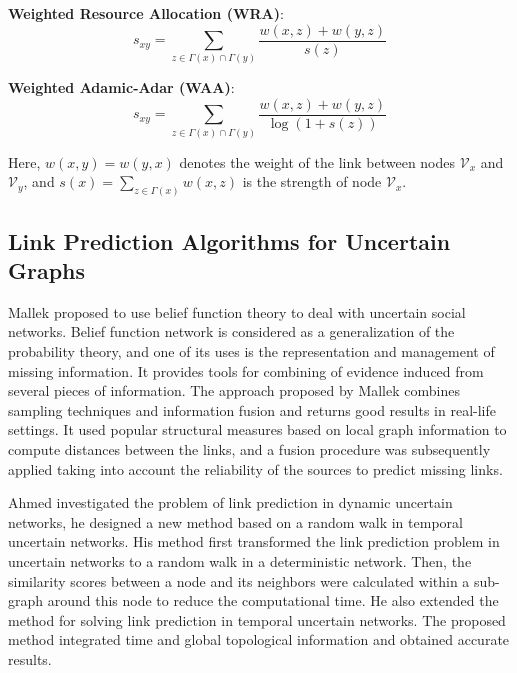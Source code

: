 \documentclass[\main/thesis.tex]{subfiles}
\begin{document}
\textbf{Weighted Resource Allocation (WRA)}:
\begin{equation}
s_{xy}=\sum_{z\in \Gamma(x)\cap\Gamma(y)}\frac{w(x,z)+w(y,z)}{s(z)}
\end{equation}

\textbf{Weighted Adamic-Adar (WAA)}:
\begin{equation}
s_{xy}=\sum_{z\in \Gamma(x)\cap\Gamma(y)}\frac{w(x,z)+w(y,z)}{\log(1+s(z))}
\end{equation}

Here, $w(x, y) = w(y, x)$ denotes the weight of the link between nodes $\mathcal{V}_x$ and $\mathcal{V}_y$, and $s(x)=\sum_{z\in\Gamma(x)}w(x,z)$ is the strength of node $\mathcal{V}_x$.

\subsection{Link Prediction Algorithms for Uncertain Graphs}
Mallek \cite{mallek2016evidential} proposed to use belief function theory to deal with uncertain social networks. Belief function network is considered as a generalization of the probability theory, and one of its uses is the representation and management of missing information. It provides tools for combining of evidence induced from several pieces of information. The approach proposed by Mallek combines sampling techniques and information fusion and returns good results in real-life settings. It used popular structural measures based on local graph information to compute distances between the links, and a fusion procedure was subsequently applied taking into account the reliability of the sources to predict missing links.

Ahmed \cite{ahmed2016efficient} investigated the problem of link prediction in dynamic uncertain networks, he designed a new method based on a random walk in temporal uncertain networks. His method first transformed the link prediction problem in uncertain networks to a random walk in a deterministic network. Then, the similarity scores between a node and its neighbors were calculated within a sub-graph around this node to reduce the computational time. He also extended the method for solving link prediction in temporal uncertain networks. The proposed method integrated time and global topological information and obtained accurate results.

\newpage
\end{document}
